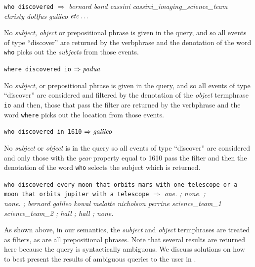 \documentclass[../main.tex]{subfiles}
\begin{document}
\begin{refsection}
\texttt{who discovered} $\Rightarrow$ \textit{bernard bond cassini cassini\_imaging\_science\_team \\ \indent \indent christy dollfus galileo} $\operatorname{\mathit{etc\ldots}}$

\examplespacing

\noindent No \textit{subject}, \textit{object} or prepositional phrase is given in the query, and so all events of type ``discover'' are returned by the verbphrase and the denotation of the word \texttt{who} picks out the \textit{subjects} from those events.

\examplespacing

\texttt{where discovered io} $\Rightarrow \operatorname{\mathit{padua}}$

\examplespacing

\noindent No \textit{subject}, or prepositional phrase is given in the query, and so all events of type ``discover'' are considered and filtered by the denotation of the \textit{object} termphrase \texttt{io} and then, those that pass the filter are returned by the verbphrase and the word \texttt{where} picks out the location from those events. %

\examplespacing

\texttt{who discovered in 1610} $\Rightarrow \operatorname{\mathit{galileo}}$

\examplespacing

\noindent No \textit{subject} or \textit{object} is in the query so all events of type ``discover'' are considered and only those with the \textit{year} property equal to 1610 pass the filter and then the denotation of the word \texttt{who} selects the subject which is returned.

\examplespacing

\texttt{who discovered every moon that orbits mars with one telescope \linebreak or a moon that orbits jupiter with a telescope} $\Rightarrow$ \textit{one. ; none. ; \\ none. ; bernard galileo kowal melotte nicholson perrine science\_team\_1 \\ science\_team\_2 ; hall ; hall ; none.}

\examplespacing

\noindent As shown above, in our semantics, the \textit{subject} and \textit{object} termphrases are treated as filters, as are all prepositional phrases. Note that several results are returned here because the query is syntactically ambiguous.  We discuss solutions on how to best present the results of ambiguous queries to the user in .


\end{refsection}
\end{document}
